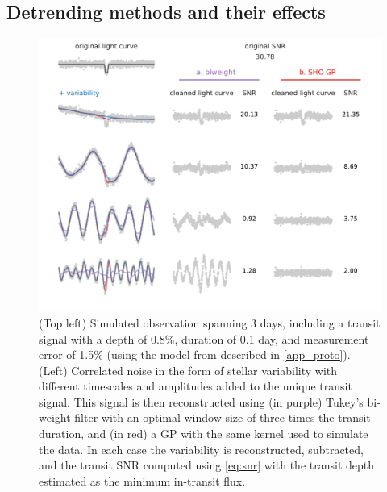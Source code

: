 \documentclass[modern]{aastex631}
\begin{document}
\subsection{Detrending methods and their effects}\label{detrending_effect}
\begin{figure}[H]
    \begin{centering}
        \includegraphics[width=\linewidth]{../workflows/plot_issues/figures/issue2.pdf}
        \caption{(Top left) Simulated observation spanning 3 days, including a transit signal with a depth of 0.8\%, duration of 0.1 day, and measurement error of 1.5\% (using the model from \cite{protopapas} described in \autoref{app_proto}). (Left) Correlated noise in the form of stellar variability with different timescales and amplitudes added to the unique transit signal. This signal is then reconstructed using (in purple) Tukey's bi-weight filter \citep{wotan} with an optimal window size of three times the transit duration, and (in red) a GP with the same kernel used to simulate the data. In each case the variability is reconstructed, subtracted, and the transit SNR computed using \autoref{eq:snr} with the transit depth estimated as the minimum in-transit flux.}
        \label{fig:issue2}
    \end{centering}
\end{figure}
\end{document}
